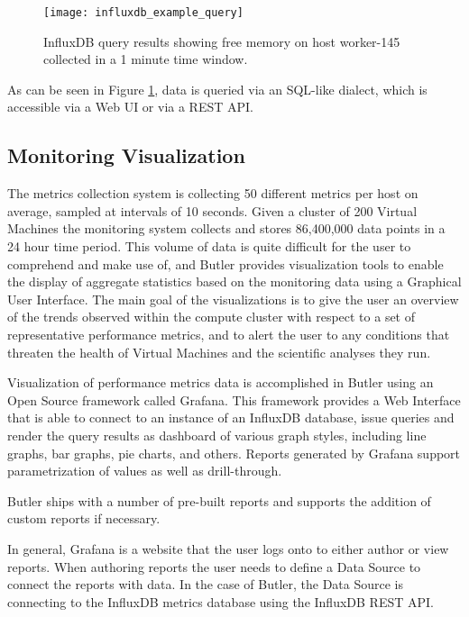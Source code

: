 \begin{figure}[h]
\texttt{[image: influxdb\_example\_query]}
\centering
\caption {InfluxDB query results showing free memory on host worker-145 collected in a 1 minute time window.}
\label{fig:influxdb_example_query}
\end{figure}

As can be seen in Figure \ref{fig:influxdb_example_query}, data is queried via an SQL-like dialect, which is accessible via a Web UI or via a REST\autocite[Chapter~5]{fielding2000architectural} API.

\subsection{Monitoring Visualization}

The metrics collection system is collecting 50 different metrics per host on average, sampled at intervals of 10 seconds. Given a cluster of 200 Virtual Machines the monitoring system collects and stores 86,400,000 data points in a 24 hour time period. This volume of data is quite difficult for the user to comprehend and make use of, and Butler provides visualization tools to enable the display of aggregate statistics based on the monitoring data using a Graphical User Interface. The main goal of the visualizations is to give the user an overview of the trends observed within the compute cluster with respect to a set of representative performance metrics, and to alert the user to any conditions that threaten the health of Virtual Machines and the scientific analyses they run.

Visualization of performance metrics data is accomplished in Butler using an Open Source framework called Grafana\autocite{Grafana.net}. This framework provides a Web Interface that is able to connect to an instance of an InfluxDB database, issue queries and render the query results as dashboard of various graph styles, including line graphs, bar graphs, pie charts, and others. Reports generated by Grafana support parametrization of values as well as drill-through.

Butler ships with a number of pre-built reports and supports the addition of custom reports if necessary.

In general, Grafana is a website that the user logs onto to either author or view reports. When authoring reports the user needs to define a Data Source to connect the reports with data. In the case of Butler, the Data Source is connecting to the InfluxDB metrics database using the InfluxDB REST API.

